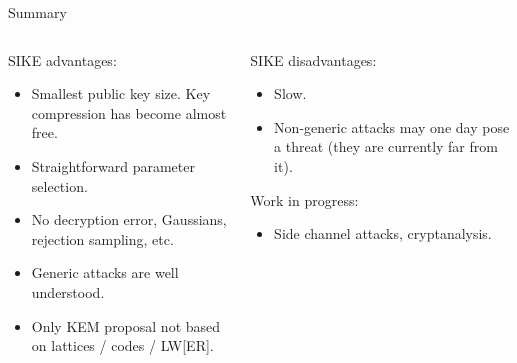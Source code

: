 \documentclass[aspectratio=169]{beamer}
\begin{document}
\begin{frame}{Summary}
  \begin{columns}[t]
    \begin{column}{0.45\textwidth}
      SIKE advantages:
      \begin{itemize}
      \item Smallest public key size. Key compression has become almost free.
      \item Straightforward parameter selection.
      \item No decryption error, Gaussians, rejection sampling, etc.
      \item Generic attacks are well understood.
      \item Only KEM proposal not based on lattices / codes / LW[ER].
      \end{itemize}
    \end{column}
    \begin{column}{0.45\textwidth}
      SIKE disadvantages:
      \begin{itemize}
      \item Slow.
      \item Non-generic attacks may one day pose a threat (they are currently far from it).
      \end{itemize}

      Work in progress:
      \begin{itemize}
      \item Side channel attacks, cryptanalysis.
      \end{itemize}
    \end{column}
  \end{columns}
\end{frame}
\end{document}
